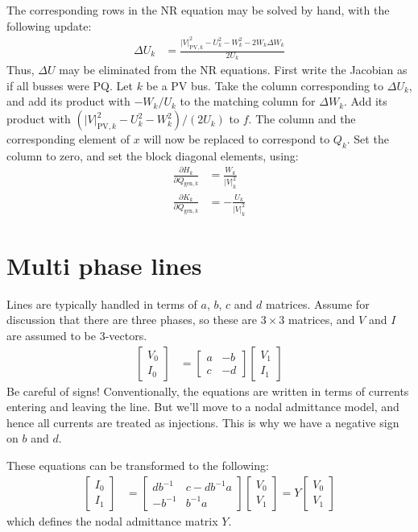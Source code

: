 \documentclass[11pt]{article}
\newcommand{\Vr}{\ensuremath{U}}
\newcommand{\Vi}{\ensuremath{W}}
\newcommand{\Ir}{\ensuremath{H}}
\newcommand{\Ii}{\ensuremath{K}}
\begin{document}
The corresponding rows in the NR equation may be solved by hand, with the following update:
\begin{align}
\Delta \Vr_k &= \frac{|V|^2_{\text{PV},k} - \Vr_k^2 - \Vi_k^2- 2\Vi_k\Delta \Vi_k}{2\Vr_k}
\end{align}
Thus, $\Delta \Vr$ may be eliminated from the NR equations.  First write the Jacobian as if all busses were PQ. Let $k$ be a PV bus. Take the column corresponding to $\Delta \Vr_k$, and add its product with $-\Vi_k/\Vr_k$ to the matching column for  $\Delta \Vi_k$. Add its product with $(|V|^2_{\text{PV},k} - \Vr_k^2 - \Vi_k^2)/(2\Vr_k)$ to $f$. The column and the corresponding element of $x$ will now be replaced to correspond to $Q_k$. Set the column to zero, and set the block diagonal elements, using:
\begin{align}
\frac{\partial \Ir_k}{\partial Q_{\text{gen},k}} &= \frac{\Vi_k}{|V|_k^2} \\
\frac{\partial \Ii_k}{\partial Q_{\text{gen},k}} &= -\frac{\Vr_k}{|V|_k^2}
\end{align}
\section{Multi phase lines}
Lines are typically handled in terms of $a$, $b$, $c$ and $d$ matrices. Assume for discussion that there are three phases, so these are $3 \times 3$ matrices, and $V$ and $I$ are assumed to be 3-vectors.
\begin{align}
	\begin{bmatrix} V_0 \\ I_0 \end{bmatrix} &=
	\begin{bmatrix} a & -b \\ c & -d \end{bmatrix} \begin{bmatrix} V_1 \\ I_1 \end{bmatrix}
\end{align}
Be careful of signs! Conventionally, the equations are written in terms of currents entering and leaving the line. But we'll move to a nodal admittance model, and hence all currents are treated as injections. This is why we have a negative sign on $b$ and $d$.

These equations can be transformed to the following:
\begin{align}
	\begin{bmatrix} I_0 \\ I_1 \end{bmatrix} &=
	\begin{bmatrix} db^{-1} & c - db^{-1}a \\ -b^{-1} & b^{-1}a \end{bmatrix} \begin{bmatrix} V_0 \\ V_1 \end{bmatrix} = Y\begin{bmatrix} V_0 \\ V_1 \end{bmatrix} 
\end{align}
which defines the nodal admittance matrix $Y$.
\end{document}
